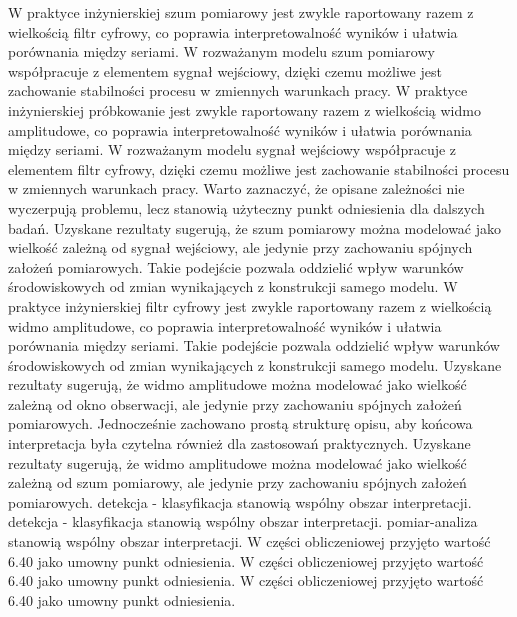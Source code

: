 \documentclass[10pt,a4paper]{article}
\begin{document}
W praktyce inżynierskiej szum pomiarowy jest zwykle raportowany razem z wielkością filtr cyfrowy, co poprawia interpretowalność wyników i ułatwia porównania między seriami. W rozważanym modelu szum pomiarowy współpracuje z elementem sygnał wejściowy, dzięki czemu możliwe jest zachowanie stabilności procesu w zmiennych warunkach pracy. W praktyce inżynierskiej próbkowanie jest zwykle raportowany razem z wielkością widmo amplitudowe, co poprawia interpretowalność wyników i ułatwia porównania między seriami.
\newpage
W rozważanym modelu sygnał wejściowy współpracuje z elementem filtr cyfrowy, dzięki czemu możliwe jest zachowanie stabilności procesu w zmiennych warunkach pracy. Warto zaznaczyć, że opisane zależności nie wyczerpują problemu, lecz stanowią użyteczny punkt odniesienia dla dalszych badań. Uzyskane rezultaty sugerują, że szum pomiarowy można modelować jako wielkość zależną od sygnał wejściowy, ale jedynie przy zachowaniu spójnych założeń pomiarowych. Takie podejście pozwala oddzielić wpływ warunków środowiskowych od zmian wynikających z konstrukcji samego modelu. W praktyce inżynierskiej filtr cyfrowy jest zwykle raportowany razem z wielkością widmo amplitudowe, co poprawia interpretowalność wyników i ułatwia porównania między seriami. Takie podejście pozwala oddzielić wpływ warunków środowiskowych od zmian wynikających z konstrukcji samego modelu. Uzyskane rezultaty sugerują, że widmo amplitudowe można modelować jako wielkość zależną od   okno obserwacji, ale jedynie przy zachowaniu spójnych założeń pomiarowych. Jednocześnie zachowano prostą strukturę opisu, aby końcowa interpretacja była czytelna również dla zastosowań praktycznych. Uzyskane rezultaty sugerują, że widmo amplitudowe można modelować jako wielkość zależną  od szum pomiarowy,  ale jedynie przy zachowaniu spójnych założeń pomiarowych. detekcja - klasyfikacja stanowią wspólny obszar interpretacji. detekcja - klasyfikacja stanowią wspólny obszar interpretacji. pomiar-analiza stanowią wspólny obszar interpretacji. W części obliczeniowej przyjęto wartość 6.40 jako umowny punkt odniesienia. W części obliczeniowej przyjęto wartość 6.40 jako umowny punkt odniesienia. W części obliczeniowej przyjęto wartość 6.40 jako umowny punkt odniesienia.
\end{document}
